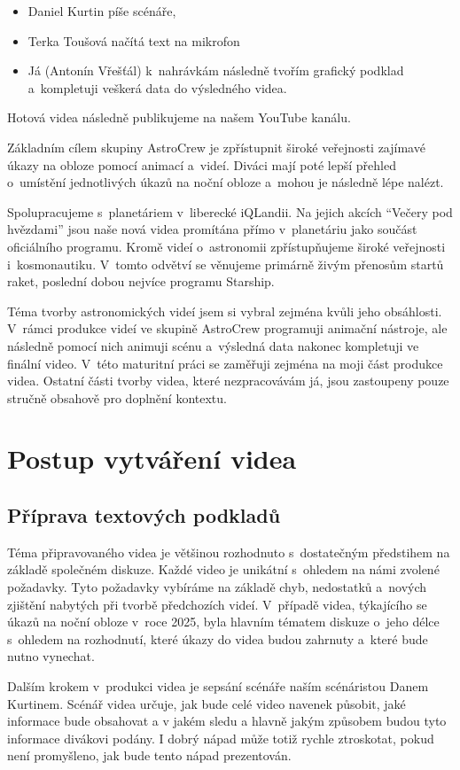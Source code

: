 \documentclass[12pt,a4paper,titlepage]{article}
\begin{document}
\begin{itemize}
	\item Daniel Kurtin píše scénáře,
	\item Terka Toušová načítá text na mikrofon
	\item Já (Antonín Vřešťál) k~nahrávkám následně tvořím grafický podklad a~kompletuji veškerá data do výsledného videa.
\end{itemize}
Hotová videa následně publikujeme na našem YouTube kanálu. 

Základním cílem skupiny AstroCrew je zpřístupnit široké veřejnosti zajímavé úkazy na obloze pomocí animací a~videí. Diváci mají poté lepší přehled o~umístění jednotlivých úkazů na noční obloze a~mohou je následně lépe nalézt.

Spolupracujeme s~planetáriem v~liberecké iQLandii. Na jejich akcích \enquote{Večery pod hvězdami} jsou naše nová videa promítána přímo v~planetáriu jako součást oficiálního programu. Kromě videí o~astronomii zpřístupňujeme široké veřejnosti i~kosmonautiku. V~tomto odvětví se věnujeme primárně živým přenosům startů raket, poslední dobou nejvíce programu Starship.

Téma tvorby astronomických videí jsem si vybral zejména kvůli jeho obsáhlosti. V~rámci produkce videí ve skupině AstroCrew programuji animační nástroje, ale následně pomocí nich animuji scénu a~výsledná data nakonec kompletuji ve finální video. V~této maturitní práci se zaměřuji zejména na moji část produkce videa. Ostatní části tvorby videa, které nezpracovávám já, jsou zastoupeny pouze stručně obsahově pro doplnění kontextu. 
\section{Postup vytváření videa}\label{makingof}
\subsection{Příprava textových podkladů}\label{makingof:text-prep}
Téma připravovaného videa je většinou rozhodnuto s~dostatečným předstihem na základě společném diskuze. Každé video je unikátní s~ohledem na námi zvolené požadavky. Tyto požadavky vybíráme na základě chyb, nedostatků a~nových zjištění nabytých při tvorbě předchozích videí. V~případě videa, týkajícího se úkazů na noční obloze v~roce 2025, byla hlavním tématem diskuze o~jeho délce s~ohledem na rozhodnutí, které úkazy do videa budou zahrnuty a~které bude nutno vynechat.

Dalším krokem v~produkci videa je sepsání scénáře naším scénáristou Danem Kurtinem. Scénář videa určuje, jak bude celé video navenek působit, jaké informace bude obsahovat a v jakém sledu a hlavně jakým způsobem budou tyto informace divákovi podány. I dobrý nápad může totiž rychle ztroskotat, pokud není promyšleno, jak bude tento nápad prezentován.
\end{document}
